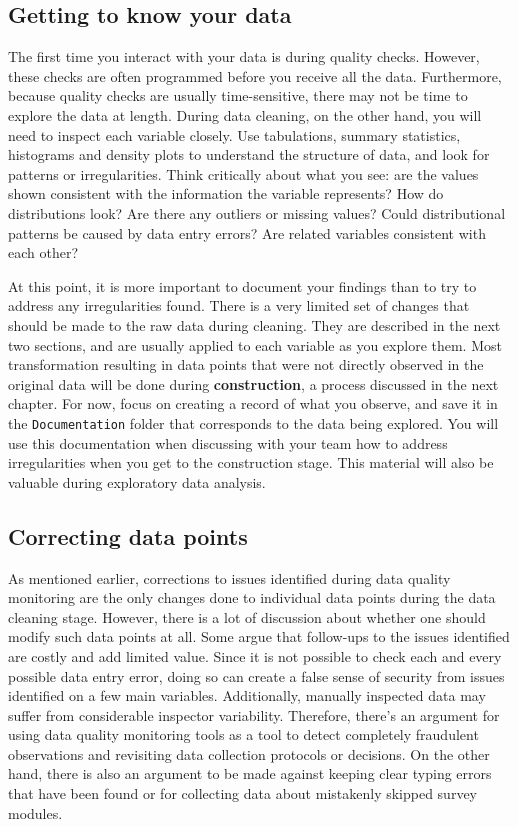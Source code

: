 \subsection{Getting to know your data}

The first time you interact with your data is during quality checks.
However, these checks are often programmed before you receive all the data.
Furthermore, because quality checks are usually time-sensitive, 
there may not be time to explore the data at length.
During data cleaning, on the other hand, 
you will need to inspect each variable closely.
Use tabulations, summary statistics, histograms and density plots to understand the structure of data,
and look for patterns or irregularities.
Think critically about what you see:
are the values shown consistent with the information the variable represents?
How do distributions look? 
Are there any outliers or missing values?
Could distributional patterns be caused by data entry errors?
Are related variables consistent with each other?

At this point, it is more important to document your findings
than to try to address any irregularities found.
There is a very limited set of changes that should be made to the raw data during cleaning.
They are described in the next two sections,
and are usually applied to each variable as you explore them.
Most transformation resulting in data points that were not directly observed in the original data
will be done during \textbf{construction}, a process discussed in the next chapter.
For now, focus on creating a record of what you observe,
and save it in the \texttt{Documentation} folder that corresponds to the data being explored.
You will use this documentation when discussing with your team
how to address irregularities when you get to the construction stage.
This material will also be valuable during exploratory data analysis.

\subsection{Correcting data points}

As mentioned earlier, 
corrections to issues identified during data quality monitoring are
the only changes done to individual data points during the data cleaning stage.
However, there is a lot of discussion about whether one should modify such data points at all.
Some argue that follow-ups to the issues identified are costly and add limited value.
Since it is not possible to check each and every possible data entry error,
doing so can create a false sense of security from issues identified on a few main variables. 
Additionally, manually inspected data may suffer from considerable inspector variability.
Therefore, there's an argument for using data quality monitoring tools
as a tool to detect completely fraudulent observations and
revisiting data collection protocols or decisions.
On the other hand, there is also an argument to be made
against keeping clear typing errors that have been found or for
collecting data about mistakenly skipped survey modules.

